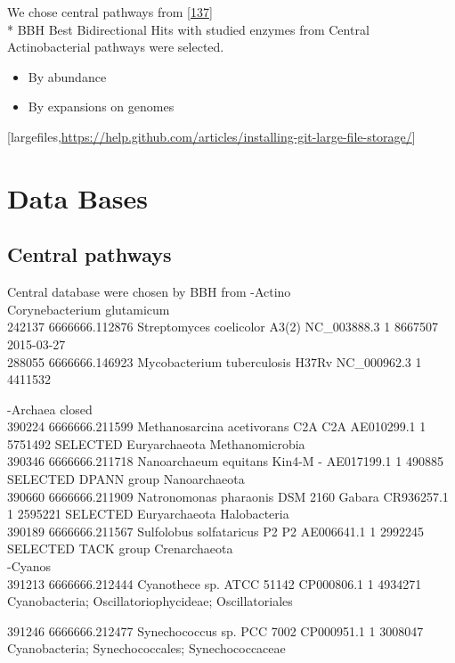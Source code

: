 \documentclass[12pt,twoside]{reedthesis}
\begin{document}
  We chose central pathways from
  {[}\protect\hyperlink{ref-barona-gomezux5fwhatux5f2012}{137}{]}\\
  * BBH Best Bidirectional Hits with studied enzymes from Central
  Actinobacterial pathways were selected.
  
  \begin{itemize}
  \item
    By abundance
  \item
    By expansions on genomes
  \end{itemize}
  
  {[}largefiles,\url{https://help.github.com/articles/installing-git-large-file-storage/}{]}
  
  \section{Data Bases}\label{data-bases}
  
  \subsection{Central pathways}\label{central-pathways}
  
  Central database were chosen by BBH from -Actino\\
  Corynebacterium glutamicum\\
  242137 6666666.112876 Streptomyces coelicolor A3(2) NC\_003888.3 1
  8667507 2015-03-27\\
  288055 6666666.146923 Mycobacterium tuberculosis H37Rv NC\_000962.3 1
  4411532
  
  -Archaea closed\\
  390224 6666666.211599 Methanosarcina acetivorans C2A C2A AE010299.1 1
  5751492 SELECTED Euryarchaeota Methanomicrobia\\
  390346 6666666.211718 Nanoarchaeum equitans Kin4-M - AE017199.1 1 490885
  SELECTED DPANN group Nanoarchaeota\\
  390660 6666666.211909 Natronomonas pharaonis DSM 2160 Gabara CR936257.1
  1 2595221 SELECTED Euryarchaeota Halobacteria\\
  390189 6666666.211567 Sulfolobus solfataricus P2 P2 AE006641.1 1 2992245
  SELECTED TACK group Crenarchaeota\\
  -Cyanos\\
  391213 6666666.212444 Cyanothece sp. ATCC 51142 CP000806.1 1 4934271
  Cyanobacteria; Oscillatoriophycideae; Oscillatoriales
  
  391246 6666666.212477 Synechococcus sp. PCC 7002 CP000951.1 1 3008047
  Cyanobacteria; Synechococcales; Synechococcaceae
  
\end{document}
